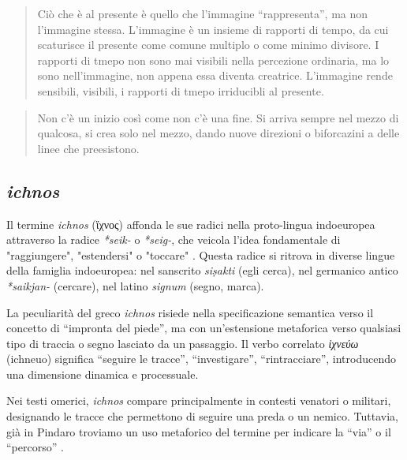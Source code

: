 \documentclass{../../lib/gs}
\begin{document}
\begin{quote}
\begin{sf}
\small
  Ciò che è al presente è quello che l'immagine “rappresenta”, ma non l'immagine
  stessa. L'immagine è un insieme di rapporti di tempo, da cui scaturisce il
  presente come comune multiplo o come minimo divisore. I rapporti di tmepo non
  sono mai visibili nella percezione ordinaria, ma lo sono nell'immagine, non
  appena essa diventa creatrice. L'immagine rende sensibili, visibili, i rapporti
  di tmepo irriducibli al presente.
  \cite{deleuze2009}
  \end{sf}
\end{quote}

\begin{quote}
\begin{sf}
\small
  Non c'è un inizio così come non c'è una fine. Si arriva sempre nel mezzo di
  qualcosa, si crea solo nel mezzo, dando nuove direzioni o biforcazini a delle
  linee che preesistono.
  \cite{deleuze2009}
  \end{sf}
\end{quote}


\subsection{\emph{ichnos}}

Il termine \textit{ichnos} (ἴχνος) affonda le sue radici nella proto-lingua indoeuropea attraverso la radice \textit{*seik-} o \textit{*seig-}, che veicola l'idea fondamentale di "raggiungere", "estendersi" o "toccare" \cite{chantraine1968}. Questa radice si ritrova in diverse lingue della famiglia indoeuropea: nel sanscrito \textit{siṣakti} (egli cerca), nel germanico antico \textit{*saikjan-} (cercare), nel latino \textit{signum} (segno, marca).

La peculiarità del greco \textit{ichnos} risiede nella specificazione semantica verso il concetto di “impronta del piede”, ma con un'estensione metaforica verso qualsiasi tipo di traccia o segno lasciato da un passaggio. Il verbo correlato \textit{ἰχνεύω} (ichneuo) significa “seguire le tracce”, “investigare”, “rintracciare”, introducendo una dimensione dinamica e processuale.

Nei testi omerici, \textit{ichnos} compare principalmente in contesti venatori o militari, designando le tracce che permettono di seguire una preda o un nemico. Tuttavia, già in Pindaro troviamo un uso metaforico del termine per indicare la “via” o il “percorso” \cite{pindar1997}.
\end{document}
